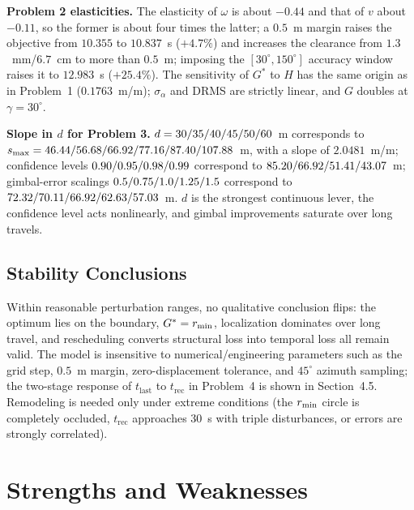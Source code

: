 \noindent\textbf{Problem 2 elasticities.} The elasticity of $\omega$ is about $-0.44$ and that of $v$ about $-0.11$, so the former is about four times the latter; a $0.5$~m margin raises the objective from $10.355$ to $10.837$~s ($+4.7\%$) and increases the clearance from $1.3$~mm/$6.7$~cm to more than $0.5$~m; imposing the $[30^\circ,150^\circ]$ accuracy window raises it to $12.983$~s ($+25.4\%$). The sensitivity of $G^*$ to $H$ has the same origin as in Problem~1 ($0.1763$~m/m); $\sigma_\alpha$ and DRMS are strictly linear, and $G$ doubles at $\gamma=30^\circ$.

\noindent\textbf{Slope in $d$ for Problem 3.} $d=30/\allowbreak35/\allowbreak40/\allowbreak45/\allowbreak50/\allowbreak60$~m corresponds to $s_{\max}=46.44/\allowbreak56.68/\allowbreak66.92/\allowbreak77.16/\allowbreak87.40/\allowbreak107.88$~m, with a slope of $2.0481$~m/m; confidence levels $0.90/\allowbreak0.95/\allowbreak0.98/\allowbreak0.99$ correspond to $85.20/\allowbreak66.92/\allowbreak51.41/\allowbreak43.07$~m; gimbal-error scalings $0.5/\allowbreak0.75/\allowbreak1.0/\allowbreak1.25/\allowbreak1.5$ correspond to $72.32/\allowbreak70.11/\allowbreak66.92/\allowbreak62.63/\allowbreak57.03$~m. $d$ is the strongest continuous lever, the confidence level acts nonlinearly, and gimbal improvements saturate over long travels.

\subsection{Stability Conclusions}

Within reasonable perturbation ranges, no qualitative conclusion flips: the optimum lies on the boundary, $G^*=r_{\min}$, localization dominates over long travel, and rescheduling converts structural loss into temporal loss all remain valid. The model is insensitive to numerical/engineering parameters such as the grid step, $0.5$~m margin, zero-displacement tolerance, and $45^\circ$ azimuth sampling; the two-stage response of $t_{\mathrm{last}}$ to $t_{\mathrm{rec}}$ in Problem~4 is shown in Section~4.5. Remodeling is needed only under extreme conditions (the $r_{\min}$ circle is completely occluded, $t_{\mathrm{rec}}$ approaches 30~s with triple disturbances, or errors are strongly correlated).

\section{Strengths and Weaknesses}
\label{sec:strengths}

